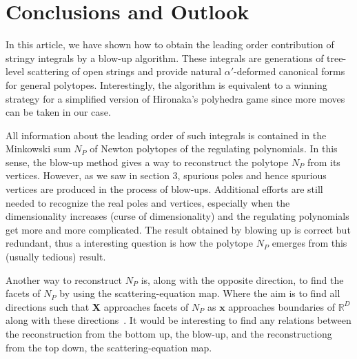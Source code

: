 \documentclass[12pt]{article}
\theoremstyle{definition}
\newtheorem{defi}[para]{Definition}
\theoremstyle{plain}
\begin{document}
% 
% 



\section{Conclusions and Outlook}


In this article, we have shown how to obtain the leading order contribution of stringy integrals by a blow-up algorithm. These integrals are generations of tree-level scattering of open strings and provide natural $\alpha'$-deformed canonical forms for general polytopes. Interestingly, the algorithm is equivalent to a winning strategy for a simplified version of Hironaka's polyhedra game since more moves can be taken in our case.

All information about the leading order of such integrals is contained in the Minkowski sum $N_{P}$ of Newton polytopes of the regulating polynomials. In this sense, the blow-up method gives a way to reconstruct the polytope $N_{P}$ from its vertices. However, as we saw in section 3, spurious poles and hence spurious vertices are produced in the process of blow-ups. Additional efforts are still needed to recognize the real poles and vertices, especially when the dimensionality increases (curse of dimensionality) and the regulating polynomials get more and more complicated. The result obtained by blowing up is correct but redundant, thus a interesting question is how the polytope $N_{P}$ emerges from this (usually tedious) result. 


Another way to reconstruct $N_{P}$ is, along with the opposite direction, to find the facets of $N_{P}$ by using the scattering-equation map. Where the aim is to find all directions such that $\mathbf{X}$ approaches facets of $N_{P}$ as $\mathbf{x}$ approaches boundaries of $\mathbb{R}^{D}$ along with these directions~\cite{He:2020ray}. It would be interesting to find any relations between the reconstruction from the bottom up, the blow-up, and the reconstructiong from the top down, the scattering-equation map.
\end{document}
